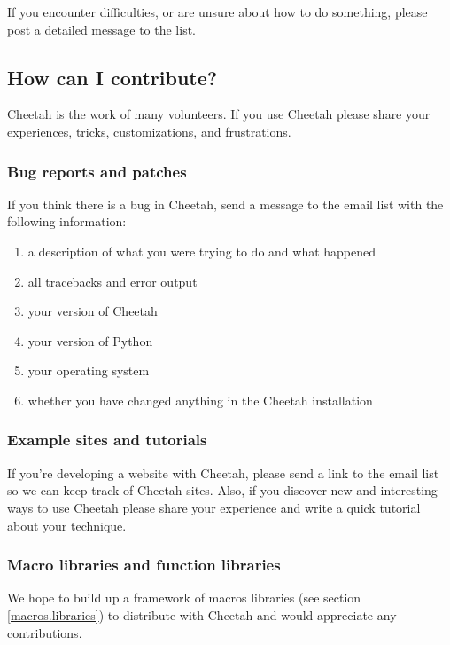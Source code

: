 If you encounter difficulties, or are unsure about how to do something,
please post a detailed message to the list.

\subsection{How can I contribute?}
\label{intro.contribute}

Cheetah is the work of many volunteers.  If you use Cheetah please share your
experiences, tricks, customizations, and frustrations.

\subsubsection{Bug reports and patches}

If you think there is a bug in Cheetah, send a message to the email list
with the following information:

\begin{enumerate}
\item a description of what you were trying to do and what happened
\item all tracebacks and error output
\item your version of Cheetah
\item your version of Python
\item your operating system
\item whether you have changed anything in the Cheetah installation
\end{enumerate}

\subsubsection{Example sites and tutorials}
If you're developing a website with Cheetah, please send a link to the
email list so we can keep track of Cheetah sites.  Also, if you discover
new and interesting ways to use Cheetah please share your experience and
write a quick tutorial about your technique.

\subsubsection{Macro libraries and function libraries}
We hope to build up a framework of macros libraries (see section
\ref{macros.libraries}) to distribute with Cheetah and would appreciate
any contributions.

